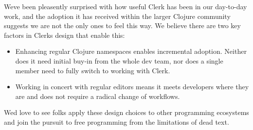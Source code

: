\documentclass[sigconf,screen]{acmart}
\providecommand{\tightlist}{%
  \setlength{\itemsep}{0pt}\setlength{\parskip}{0pt}}
\begin{document}
We\textquotesingle ve been pleasently surprised with how useful Clerk has been in our day-to-day work, and the adoption it has received within the larger Clojure community suggests we are not the only ones to feel this way. We believe there are two key factors in Clerk\textquotesingle s design that enable this:

\begin{itemize}
\tightlist
\item
  Enhancing regular Clojure namespaces enables incremental adoption. Neither does it need initial buy-in from the whole dev team, nor does a single member need to fully switch to working with Clerk.
\item
  Working in concert with regular editors means it meets developers where they are and does not require a radical change of workflows.
\end{itemize}

We\textquotesingle d love to see folks apply these design choices to other programming ecosystems and join the pursuit to free programming from the limitations of dead text.

%
%
%
%
\end{document}
